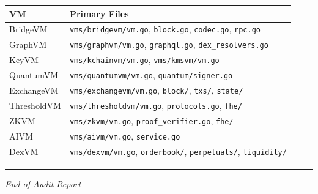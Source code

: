 \documentclass[
]{article}
\newcounter{none} %
\begin{document}
{\def\LTcaptype{none} %
\begin{longtable}[]{@{}ll@{}}
\toprule\noalign{}
VM & Primary Files \\
\midrule\noalign{}
\endhead
\bottomrule\noalign{}
\endlastfoot
BridgeVM & \texttt{vms/bridgevm/vm.go}, \texttt{block.go},
\texttt{codec.go}, \texttt{rpc.go} \\
GraphVM & \texttt{vms/graphvm/vm.go}, \texttt{graphql.go},
\texttt{dex\_resolvers.go} \\
KeyVM & \texttt{vms/kchainvm/vm.go}, \texttt{vms/kmsvm/vm.go} \\
QuantumVM & \texttt{vms/quantumvm/vm.go}, \texttt{quantum/signer.go} \\
ExchangeVM & \texttt{vms/exchangevm/vm.go}, \texttt{block/},
\texttt{txs/}, \texttt{state/} \\
ThresholdVM & \texttt{vms/thresholdvm/vm.go}, \texttt{protocols.go},
\texttt{fhe/} \\
ZKVM & \texttt{vms/zkvm/vm.go}, \texttt{proof\_verifier.go},
\texttt{fhe/} \\
AIVM & \texttt{vms/aivm/vm.go}, \texttt{service.go} \\
DexVM & \texttt{vms/dexvm/vm.go}, \texttt{orderbook/},
\texttt{perpetuals/}, \texttt{liquidity/} \\
\end{longtable}
}

\begin{center}\rule{0.5\linewidth}{0.5pt}\end{center}

\emph{End of Audit Report}
\end{document}

